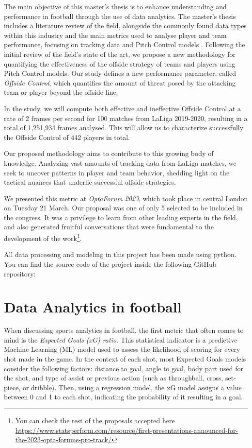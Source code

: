 \documentclass[
  10pt,
  twoside,nohyper]{book}
\begin{document}
The main objective of this master's thesis is to enhance understanding and performance in football through the use of data analytics. The master's thesis includes a literature review of the field, alongside the commonly found data types within this industry and the main metrics used to analyse player and team performance, focusing on tracking data and Pitch Control models \autocite{Spearman}. Following the initial review of the field's state of the art, we propose a new methodology for quantifying the effectiveness of the offside strategy of teams and players using Pitch Control models. Our study defines a new performance parameter, called \emph{Offside Control}, which quantifies the amount of threat posed by the attacking team or player beyond the offside line.

In the study, we will compute both effective and ineffective Offside Control at a rate of 2 frames per second for 100 matches from LaLiga 2019-2020, resulting in a total of 1,251,934 frames analysed. This will allow us to characterize successfully the Offside Control of 442 players in total.

Our proposed methodology aims to contribute to this growing body of knowledge. Analyzing vast amounts of tracking data from LaLiga matches, we seek to uncover patterns in player and team behavior, shedding light on the tactical nuances that underlie successful offside strategies.

We presented this metric at \emph{OptaForum 2023}, which took place in central London on Tuesday 21 March. Our proposal was one of only 5 selected to be included in the congress. It was a privilege to learn from other leading experts in the field, and also generated fruitful conversations that were fundamental to the development of the work\footnote{You can check the rest of the proposals accepted here \url{https://www.statsperform.com/resource/first-presentations-announced-for-the-2023-opta-forums-pro-track/}}.

All data processing and modeling in this project has been made using python. You can find the source code of the project inside the following GitHub repository:

\chapter{Data Analytics in football}\label{data-analytics-in-football}

When discussing sports analytics in football, the first metric that
often comes to mind is the \emph{Expected Goals (xG) ratio}. This statistical indicator is a predictive Machine Learning (ML) model used to assess the likelihood of scoring for every shot made in the game. In the context of each shot, most Expected Goals models consider the following factors: distance to goal, angle to goal, body part used for the shot, and type of assist or previous action (such as throughball, cross, set-piece, or dribble). Then, using a regression model, the xG model assigns a value between 0 and 1 to each shot, indicating the probability of it resulting in a goal.
\end{document}
